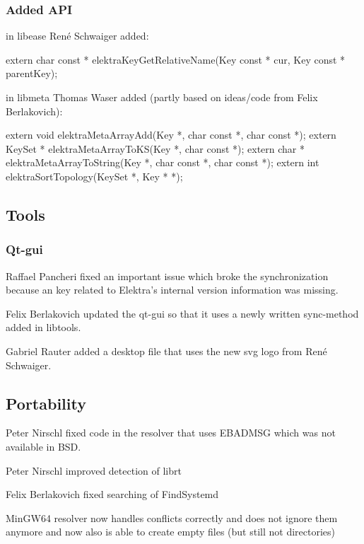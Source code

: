 \subsubsection*{Added A\+P\+I}

in libease René Schwaiger added\+: \begin{DoxyVerb}extern char const * elektraKeyGetRelativeName(Key const * cur, Key const * parentKey);
\end{DoxyVerb}


in libmeta Thomas Waser added (partly based on ideas/code from Felix Berlakovich)\+: \begin{DoxyVerb}extern void elektraMetaArrayAdd(Key *, char const *, char const *);
extern KeySet * elektraMetaArrayToKS(Key *, char const *);
extern char * elektraMetaArrayToString(Key *, char const *, char const *);
extern int elektraSortTopology(KeySet *, Key * *);
\end{DoxyVerb}


\subsection*{Tools}

\subsubsection*{Qt-\/gui}

Raffael Pancheri fixed an important issue which broke the synchronization because an key related to Elektra's internal version information was missing.

Felix Berlakovich updated the qt-\/gui so that it uses a newly written sync-\/method added in libtools.

Gabriel Rauter added a desktop file that uses the new svg logo from René Schwaiger.

\subsection*{Portability}


\begin{DoxyItemize}
\item Peter Nirschl fixed code in the resolver that uses E\+B\+A\+D\+M\+S\+G which was not available in B\+S\+D.
\item Peter Nirschl improved detection of librt
\item Felix Berlakovich fixed searching of Find\+Systemd
\item Min\+G\+W64 resolver now handles conflicts correctly and does not ignore them anymore and now also is able to create empty files (but still not directories)
\end{DoxyItemize}


